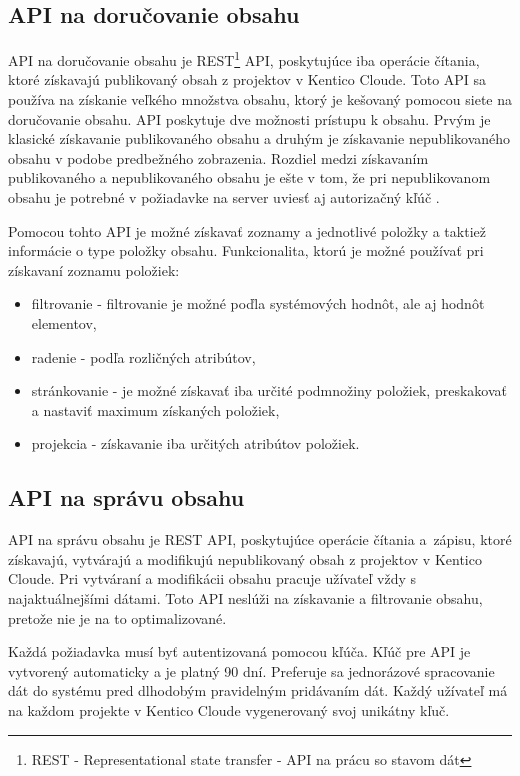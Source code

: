 \documentclass[
  printed, %
  table,   %
  lof,     %
  nolot,     %
  twoside,  
]{fithesis3}
\begin{document}
\subsection{API na doručovanie obsahu}
API na doručovanie obsahu je REST\footnote{REST - Representational state transfer - API na prácu so stavom dát} API, poskytujúce iba operácie čítania, ktoré získavajú publikovaný obsah z projektov v Kentico Cloude. Toto API sa používa na získanie veľkého množstva obsahu, ktorý je kešovaný pomocou siete na doručovanie obsahu. API poskytuje dve možnosti prístupu k obsahu. Prvým je klasické získavanie publikovaného obsahu a druhým je získavanie nepublikovaného obsahu v podobe predbežného zobrazenia. Rozdiel medzi získavaním publikovaného a nepublikovaného obsahu je ešte v tom, že pri nepublikovanom obsahu je potrebné v požiadavke na server uviesť aj autorizačný kľúč \cite{delivery}. 

Pomocou tohto API je možné získavať zoznamy a jednotlivé položky a taktiež informácie o type položky obsahu. Funkcionalita, ktorú je možné používať pri získavaní zoznamu položiek:
\begin{itemize}
	\item filtrovanie - filtrovanie je možné poďla systémových hodnôt, ale aj hodnôt elementov,
	\item radenie - podľa rozličných atribútov,
	\item stránkovanie - je možné získavať iba určité podmnožiny položiek, preskakovať a nastaviť maximum získaných položiek,
	\item projekcia - získavanie iba určitých atribútov položiek.
\end{itemize}
\subsection{API na správu obsahu}
API na správu obsahu je REST API, poskytujúce operácie čítania a~zápisu, ktoré získavajú, vytvárajú a modifikujú nepublikovaný obsah z projektov v Kentico Cloude. Pri vytváraní a modifikácii obsahu pracuje užívateľ vždy s najaktuálnejšími dátami. Toto API neslúži na získavanie a filtrovanie obsahu, pretože nie je na to optimalizované.

Každá požiadavka musí byť autentizovaná pomocou kľúča. Kľúč pre API je vytvorený automaticky a je platný 90 dní. 
Preferuje sa jednorázové spracovanie dát do systému pred dlhodobým pravidelným pridávaním dát. Každý užívateľ má na každom projekte v Kentico Cloude vygenerovaný svoj unikátny kľuč.
\end{document}
